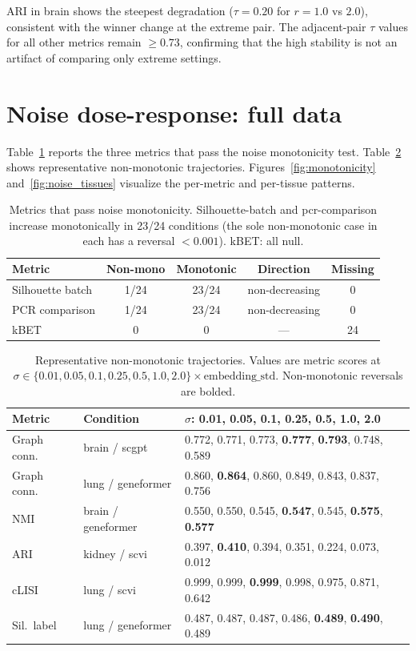 \documentclass[10pt,letterpaper]{article}
\begin{document}
ARI in brain shows the steepest degradation ($\tau = 0.20$ for $r = 1.0$ vs $2.0$), consistent with the winner change at the extreme pair. The adjacent-pair $\tau$ values for all other metrics remain $\geq 0.73$, confirming that the high stability is not an artifact of comparing only extreme settings.


\section{Noise dose-response: full data}
\label{app:noise}

Table~\ref{tab:app_noise_pass} reports the three metrics that pass the noise monotonicity test. Table~\ref{tab:app_noise_fail} shows representative non-monotonic trajectories. Figures~\ref{fig:monotonicity} and~\ref{fig:noise_tissues} visualize the per-metric and per-tissue patterns.

\begin{table}[h!]
\centering
\caption{Metrics that pass noise monotonicity. Silhouette-batch and pcr-comparison increase monotonically in 23/24 conditions (the sole non-monotonic case in each has a reversal $< 0.001$). kBET: all null.}
\label{tab:app_noise_pass}
\small
\begin{tabular}{@{}lcccc@{}}
\toprule
Metric & Non-mono & Monotonic & Direction & Missing \\
\midrule
Silhouette batch & 1/24 & 23/24 & non-decreasing & 0 \\
PCR comparison   & 1/24 & 23/24 & non-decreasing & 0 \\
kBET             & 0    & 0     & ---            & 24 \\
\bottomrule
\end{tabular}
\end{table}

\begin{table}[h!]
\centering
\caption{Representative non-monotonic trajectories. Values are metric scores at $\sigma \in \{0.01, 0.05, 0.1, 0.25, 0.5, 1.0, 2.0\} \times \text{embedding\_std}$. Non-monotonic reversals are bolded.}
\label{tab:app_noise_fail}
\footnotesize
\begin{tabular}{@{}llp{}@{}}
\toprule
Metric & Condition & $\sigma$: 0.01, 0.05, 0.1, 0.25, 0.5, 1.0, 2.0 \\
\midrule
Graph conn. & brain / scgpt & 0.772, 0.771, 0.773, \textbf{0.777}, \textbf{0.793}, 0.748, 0.589 \\
Graph conn. & lung / geneformer & 0.860, \textbf{0.864}, 0.860, 0.849, 0.843, 0.837, 0.756 \\
NMI & brain / geneformer & 0.550, 0.550, 0.545, \textbf{0.547}, 0.545, \textbf{0.575}, \textbf{0.577} \\
ARI & kidney / scvi & 0.397, \textbf{0.410}, 0.394, 0.351, 0.224, 0.073, 0.012 \\
cLISI & lung / scvi & 0.999, 0.999, \textbf{0.999}, 0.998, 0.975, 0.871, 0.642 \\
Sil.\ label & lung / geneformer & 0.487, 0.487, 0.487, 0.486, \textbf{0.489}, \textbf{0.490}, 0.489 \\
\bottomrule
\end{tabular}
\end{table}
\end{document}
